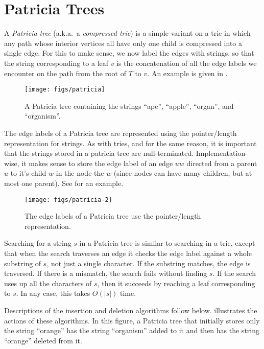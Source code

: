 \section{Patricia Trees}

A \emph{Patricia tree} (a.k.a.\ a \emph{compressed trie}) is a simple
variant on a trie in which any path whose interior vertices all have only
one child is compressed into a single edge.  For this to make sense,
we now label the edges with strings, so that the string corresponding
to a leaf $v$ is the concatenation of all the edge labels we encounter
on the path from the root of $T$ to $v$.  An example is given in
.

\begin{figure}
  \begin{center}
    \texttt{[image: figs/patricia]}
  \end{center}
  \caption{A Patricia tree containing the strings ``ape'', ``apple'', ``organ'', and ``organism''.}
\end{figure}

The edge labels of a Patricia tree are represented using the
pointer/length representation for strings.  As with tries, and for the
same reason, it is important that the strings stored in a patricia tree
are null-terminated.  Implementation-wise, it makes sense to store the
edge label of an edge $uw$ directed from a parent $u$ to it's child $w$
in the node the $w$ (since nodes can have many children, but at most
one parent).  See  for an example.

\begin{figure}
  \begin{center}
    \texttt{[image: figs/patricia-2]}
  \end{center}
  \caption{The edge labels of a Patricia tree use the pointer/length representation.}
\end{figure}

Searching for a string $s$ in a Patricia tree is similar to searching
in a trie, except that when the search traverses an edge it checks the
edge label against a whole substring of $s$, not just a single character.
If the substring matches, the edge is traversed. If there is a mismatch,
the search fails without finding $s$.  If the search uses up all the
characters of $s$, then it succeeds by reaching a leaf corresponding
to $s$.  In any case, this takes $O(|s|)$ time.

Descriptions of the insertion and deletion algorithms follow below.
 illustrates the actions of these algorithms.
In this figure, a Patricia tree that initially stores only the string
``orange'' has the string ``organism'' added to it and then has the string
``orange'' deleted from it.

